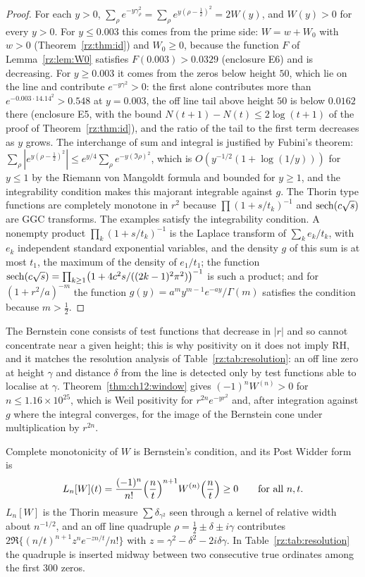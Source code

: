 \begin{proof}
For each $y>0$, $\sum_\rho e^{-y\gamma_\rho^2}=\sum_\rho e^{y(\rho-\frac12)^2}=2W(y)$, and $W(y)>0$ for every $y>0$. For $y\le0.003$ this comes from the prime side: $W=w+W_0$ with $w>0$ (Theorem~\ref{rz:thm:id}) and $W_0\ge0$, because the function $F$ of Lemma~\ref{rz:lem:W0} satisfies $F(0.003)>0.0329$ (enclosure E6) and is decreasing. For $y\ge0.003$ it comes from the zeros below height $50$, which lie on the line and contribute $e^{-y\gamma^2}>0$: the first alone contributes more than $e^{-0.003\cdot14.14^2}>0.548$ at $y=0.003$, the off line tail above height $50$ is below $0.0162$ there (enclosure E5, with the bound $N(t+1)-N(t)\le2\log(t+1)$ of the proof of Theorem~\ref{rz:thm:id}), and the ratio of the tail to the first term decreases as $y$ grows. The interchange of sum and integral is justified by Fubini's theorem: $\sum_\rho|e^{y(\rho-\frac12)^2}|\le e^{y/4}\sum_\rho e^{-y(\Im\rho)^2}$, which is $O(y^{-1/2}(1+\log(1/y)))$ for $y\le1$ by the Riemann von Mangoldt formula and bounded for $y\ge1$, and the integrability condition makes this majorant integrable against $g$. The Thorin type functions are completely monotone in $r^2$ because $\prod(1+s/t_k)^{-1}$ and $\operatorname{sech}(c\sqrt{s})$ are GGC transforms. The examples satisfy the integrability condition. A nonempty product $\prod_k(1+s/t_k)^{-1}$ is the Laplace transform of $\sum_ke_k/t_k$, with $e_k$ independent standard exponential variables, and the density $g$ of this sum is at most $t_1$, the maximum of the density of $e_1/t_1$; the function $\operatorname{sech}(c\sqrt{s})=\prod_{k\ge1}\bigl(1+4c^2s/((2k-1)^2\pi^2)\bigr)^{-1}$ is such a product; and for $(1+r^2/a)^{-m}$ the function $g(y)=a^my^{m-1}e^{-ay}/\Gamma(m)$ satisfies the condition because $m>\frac12$.
\end{proof}

The Bernstein cone consists of test functions that decrease in $|r|$ and so cannot concentrate near a given height; this is why positivity on it does not imply RH, and it matches the resolution analysis of Table~\ref{rz:tab:resolution}: an off line zero at height $\gamma$ and distance $\delta$ from the line is detected only by test functions able to localise at $\gamma$. Theorem~\ref{thm:ch12:window} gives $(-1)^nW^{(n)}>0$ for $n\le1.16\times10^{25}$, which is Weil positivity for $r^{2n}e^{-yr^2}$ and, after integration against $g$ where the integral converges, for the image of the Bernstein cone under multiplication by $r^{2n}$.

Complete monotonicity of $W$ is Bernstein's condition, and its Post Widder form is
\[
L_n[W](t)=\frac{(-1)^n}{n!}\Bigl(\frac nt\Bigr)^{n+1}W^{(n)}\Bigl(\frac nt\Bigr)\ge0\qquad\text{for all }n,t .
\]
$L_n[W]$ is the Thorin measure $\sum\delta_{\gamma^2}$ seen through a kernel of relative width about $n^{-1/2}$, and an off line quadruple $\rho=\frac12\pm\delta\pm i\gamma$ contributes $2\Re\{(n/t)^{n+1}z^ne^{-zn/t}/n!\}$ with $z=\gamma^2-\delta^2-2i\delta\gamma$. In Table~\ref{rz:tab:resolution} the quadruple is inserted midway between two consecutive true ordinates among the first 300 zeros.

